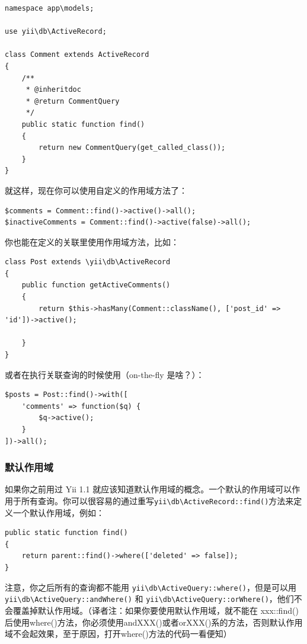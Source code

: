 \lstset{language=php}\begin{lstlisting}
namespace app\models;

use yii\db\ActiveRecord;

class Comment extends ActiveRecord
{
    /**
     * @inheritdoc
     * @return CommentQuery
     */
    public static function find()
    {
        return new CommentQuery(get_called_class());
    }
}
\end{lstlisting}
就这样，现在你可以使用自定义的作用域方法了：

\lstset{language=php}\begin{lstlisting}
$comments = Comment::find()->active()->all();
$inactiveComments = Comment::find()->active(false)->all();
\end{lstlisting}
你也能在定义的关联里使用作用域方法，比如：

\lstset{language=php}\begin{lstlisting}
class Post extends \yii\db\ActiveRecord
{
    public function getActiveComments()
    {
        return $this->hasMany(Comment::className(), ['post_id' => 'id'])->active();

    }
}
\end{lstlisting}
或者在执行关联查询的时候使用（on-the-fly 是啥？）：

\lstset{language=php}\begin{lstlisting}
$posts = Post::find()->with([
    'comments' => function($q) {
        $q->active();
    }
])->all();
\end{lstlisting}
\subsubsection{默认作用域}
如果你之前用过 Yii 1.1 就应该知道默认作用域的概念。一个默认的作用域可以作用于所有查询。你可以很容易的通过重写\texttt{yii{\allowbreak{}\textbackslash}db{\allowbreak{}\textbackslash}ActiveRecord\allowbreak{}::\allowbreak{}find()}方法来定义一个默认作用域，例如：

\lstset{language=php}\begin{lstlisting}
public static function find()
{
    return parent::find()->where(['deleted' => false]);
}
\end{lstlisting}
注意，你之后所有的查询都不能用 \texttt{yii{\allowbreak{}\textbackslash}db{\allowbreak{}\textbackslash}ActiveQuery\allowbreak{}::\allowbreak{}where()}，但是可以用 \texttt{yii{\allowbreak{}\textbackslash}db{\allowbreak{}\textbackslash}ActiveQuery\allowbreak{}::\allowbreak{}andWhere()} 和 \texttt{yii{\allowbreak{}\textbackslash}db{\allowbreak{}\textbackslash}ActiveQuery\allowbreak{}::\allowbreak{}orWhere()}，他们不会覆盖掉默认作用域。（译者注：如果你要使用默认作用域，就不能在 xxx::find()后使用where()方法，你必须使用andXXX()或者orXXX()系的方法，否则默认作用域不会起效果，至于原因，打开where()方法的代码一看便知）

